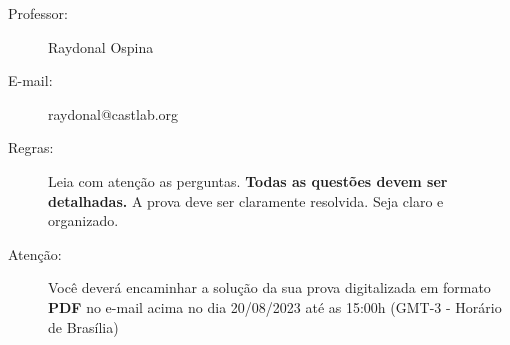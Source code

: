 \documentclass[a4paper,12pt,oneside,twocolumn]{Config/milktest}
\begin{document}
\beb
{\small
\begin{description}
\item[Professor:] Raydonal Ospina
\item[E-mail:] raydonal@castlab.org

\item[Regras:] Leia com atenção as perguntas. {\bf Todas as questões devem ser detalhadas.} A prova deve ser claramente resolvida. Seja claro e organizado. 

\item[Atenção:] Você deverá encaminhar a solução da sua prova digitalizada em formato {\bf PDF} no e-mail acima no dia 20/08/2023 até as 15:00h (GMT-3 - Horário de Brasília) 
\end{description}
}
\eeb

\balance




\end{document}
